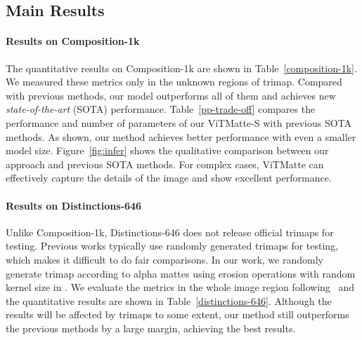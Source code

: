 \documentclass[10pt,twocolumn,letterpaper]{article}
\newcommand{\thename}{ViTMatte}
\begin{document}
\subsection{Main Results}
\paragraph{Results on Composition-1k} The quantitative results on Composition-1k are shown in Table~\ref{composition-1k}. We measured these metrics only in the unknown regions of trimap. Compared with previous methods, our model outperforms all of them and achieves new \emph{state-of-the-art} (SOTA) performance. Table~\ref{pp-trade-off} compares the performance and number of parameters of our \thename-S with previous SOTA methods. As shown, our method achieves better performance with even a smaller model size. Figure~\ref{fig:infer} shows the qualitative comparison between our approach and previous SOTA methods. For complex cases, \thename{} can effectively capture the details of the image and show excellent performance. 

\paragraph{Results on Distinctions-646} Unlike Composition-1k, Distinctions-646 does not release official trimaps for testing. Previous works typically use randomly generated trimaps for testing, which makes it difficult to do fair comparisons. In our work, we randomly generate trimap according to alpha mattes using erosion operations with random kernel size in .  We evaluate the metrics in the whole image region following~\cite{HAttMatting} and the quantitative results are shown in Table~\ref{distinctions-646}. Although the results will be affected by trimaps to some extent, our method still outperforms the previous methods by a large margin, achieving the best results.
\end{document}
